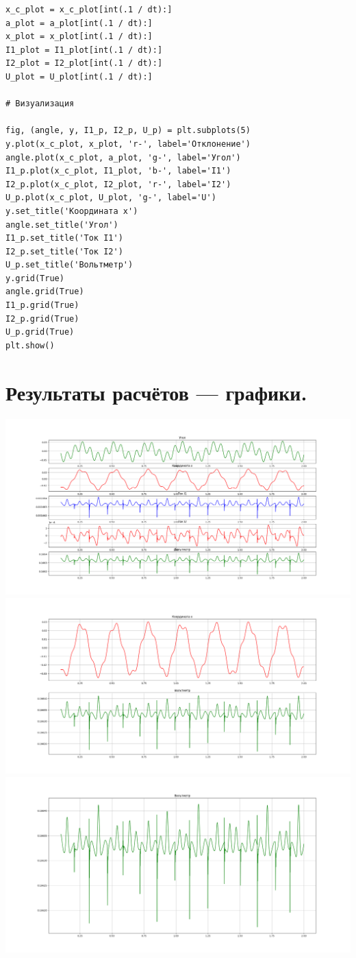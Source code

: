 \documentclass[a4paper,14pt]{extarticle}
\begin{document}
\begin{verbatim}
x_c_plot = x_c_plot[int(.1 / dt):]
a_plot = a_plot[int(.1 / dt):]
x_plot = x_plot[int(.1 / dt):]
I1_plot = I1_plot[int(.1 / dt):]
I2_plot = I2_plot[int(.1 / dt):]
U_plot = U_plot[int(.1 / dt):]

# Визуализация

fig, (angle, y, I1_p, I2_p, U_p) = plt.subplots(5)
y.plot(x_c_plot, x_plot, 'r-', label='Отклонение')
angle.plot(x_c_plot, a_plot, 'g-', label='Угол')
I1_p.plot(x_c_plot, I1_plot, 'b-', label='I1')
I2_p.plot(x_c_plot, I2_plot, 'r-', label='I2')
U_p.plot(x_c_plot, U_plot, 'g-', label='U')
y.set_title('Координата x')
angle.set_title('Угол')
I1_p.set_title('Ток I1')
I2_p.set_title('Ток I2')
U_p.set_title('Вольтметр')
y.grid(True)
angle.grid(True)
I1_p.grid(True)
I2_p.grid(True)
U_p.grid(True)
plt.show()
\end{verbatim}

\section{Результаты расчётов — графики.}
\begin{center}
    \includegraphics[width=200mm]{g1}
    \includegraphics[width=200mm]{g2}
    \includegraphics[width=200mm]{g3}
\end{center}
\end{document}
